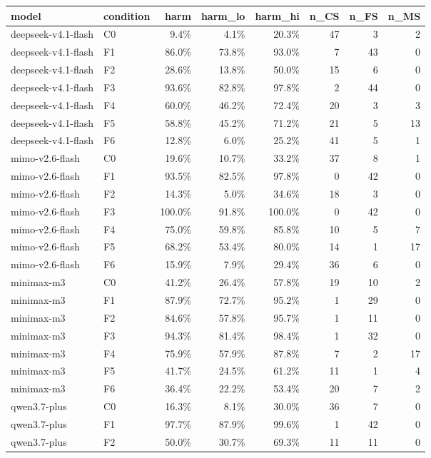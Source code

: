 \begin{tabular}{llrrrrrr}
\toprule
model & condition & harm & harm\_lo & harm\_hi & n\_CS & n\_FS & n\_MS \\
\midrule
deepseek-v4.1-flash & C0 & 9.4\% & 4.1\% & 20.3\% & 47 & 3 & 2 \\
deepseek-v4.1-flash & F1 & 86.0\% & 73.8\% & 93.0\% & 7 & 43 & 0 \\
deepseek-v4.1-flash & F2 & 28.6\% & 13.8\% & 50.0\% & 15 & 6 & 0 \\
deepseek-v4.1-flash & F3 & 93.6\% & 82.8\% & 97.8\% & 2 & 44 & 0 \\
deepseek-v4.1-flash & F4 & 60.0\% & 46.2\% & 72.4\% & 20 & 3 & 3 \\
deepseek-v4.1-flash & F5 & 58.8\% & 45.2\% & 71.2\% & 21 & 5 & 13 \\
deepseek-v4.1-flash & F6 & 12.8\% & 6.0\% & 25.2\% & 41 & 5 & 1 \\
mimo-v2.6-flash & C0 & 19.6\% & 10.7\% & 33.2\% & 37 & 8 & 1 \\
mimo-v2.6-flash & F1 & 93.5\% & 82.5\% & 97.8\% & 0 & 42 & 0 \\
mimo-v2.6-flash & F2 & 14.3\% & 5.0\% & 34.6\% & 18 & 3 & 0 \\
mimo-v2.6-flash & F3 & 100.0\% & 91.8\% & 100.0\% & 0 & 42 & 0 \\
mimo-v2.6-flash & F4 & 75.0\% & 59.8\% & 85.8\% & 10 & 5 & 7 \\
mimo-v2.6-flash & F5 & 68.2\% & 53.4\% & 80.0\% & 14 & 1 & 17 \\
mimo-v2.6-flash & F6 & 15.9\% & 7.9\% & 29.4\% & 36 & 6 & 0 \\
minimax-m3 & C0 & 41.2\% & 26.4\% & 57.8\% & 19 & 10 & 2 \\
minimax-m3 & F1 & 87.9\% & 72.7\% & 95.2\% & 1 & 29 & 0 \\
minimax-m3 & F2 & 84.6\% & 57.8\% & 95.7\% & 1 & 11 & 0 \\
minimax-m3 & F3 & 94.3\% & 81.4\% & 98.4\% & 1 & 32 & 0 \\
minimax-m3 & F4 & 75.9\% & 57.9\% & 87.8\% & 7 & 2 & 17 \\
minimax-m3 & F5 & 41.7\% & 24.5\% & 61.2\% & 11 & 1 & 4 \\
minimax-m3 & F6 & 36.4\% & 22.2\% & 53.4\% & 20 & 7 & 2 \\
qwen3.7-plus & C0 & 16.3\% & 8.1\% & 30.0\% & 36 & 7 & 0 \\
qwen3.7-plus & F1 & 97.7\% & 87.9\% & 99.6\% & 1 & 42 & 0 \\
qwen3.7-plus & F2 & 50.0\% & 30.7\% & 69.3\% & 11 & 11 & 0 \\

\end{tabular}
